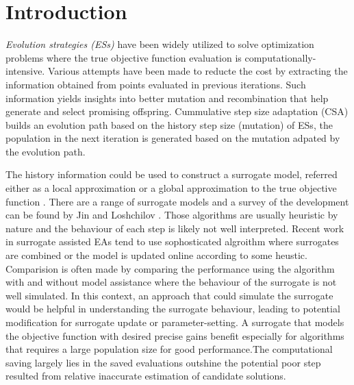 \section{Introduction}


\textit{Evolution strategies (ESs)} have been widely utilized to solve optimization problems where the true objective function evaluation is computationally-intensive. Various attempts have been made to reducte the cost by extracting the information obtained from points evaluated in previous iterations. Such information yields insights into better mutation and recombination that help generate and select promising offspring. Cummulative step size adaptation (CSA) \cite{Ostermeier:1994:DAS:1326675.1326679} builds an evolution path based on the history step size (mutation) of ESs, the population in the next iteration is generated based on the mutation adpated by the evolution path. 

The history information could be used to construct a surrogate model, referred either as a local approximation or a global approximation to the true objective function \cite{Jin:2002:FAE:2955491.2955686}. There are a range of surrogate models and a survey of the development can be found by Jin \cite{JIN201161} and Loshchilov \cite{ECJ2016_LMCMA}. Those algorithms are usually heuristic by nature and the behaviour of each step is likely not well interpreted. Recent work in surrogate assisted EAs tend to use sophosticated algroithm where surrogates are combined or the model is updated online according to some heustic. Comparision is often made by comparing the performance using the algorithm with and without model assistance where the behaviour of the surrogate is not well simulated. In this context, an approach that could simulate the surrogate would be helpful in understanding the surrogate behaviour, leading to potential modification for surrogate update or parameter-setting. A surrogate that models the objective function with desired precise gains benefit especially for algorithms that requires a large population size for good performance.The computational saving largely lies in the saved evaluations outshine the potential poor step resulted from relative inaccurate estimation of candidate solutions. 


